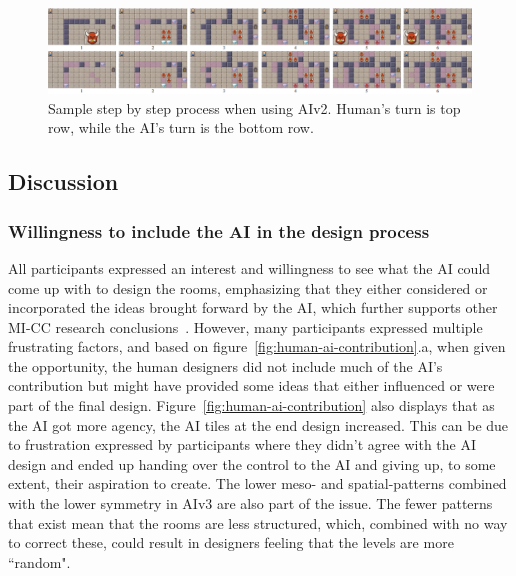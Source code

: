 


\begin{figure}[h!]
 \includegraphics[width=\textwidth]{images/rooms-designed-2.png}
 \caption{Sample step by step process when using AIv2. Human's turn is top row, while the AI's turn is the bottom row.}
 \label{fig:exampleDesignProcess}
\end{figure}

\subsection{Discussion}
\label{sec:discussion}


\subsubsection{Willingness to include the AI in the design process}

All participants expressed an interest and willingness to see what the AI could come up with to design the rooms, emphasizing that they either considered or incorporated the ideas brought forward by the AI, which further supports other MI-CC research conclusions~. However, many participants expressed multiple frustrating factors, and based on figure~\ref{fig:human-ai-contribution}.a, when given the opportunity, the human designers did not include much of the AI's contribution but might have provided some ideas that either influenced or were part of the final design. Figure~\ref{fig:human-ai-contribution} also displays that as the AI got more agency, the AI tiles at the end design increased. This can be due to frustration expressed by participants where they didn't agree with the AI design and ended up handing over the control to the AI and giving up, to some extent, their aspiration to create. The lower meso- and spatial-patterns combined with the lower symmetry in AIv3 are also part of the issue. The fewer patterns that exist mean that the rooms are less structured, which, combined with no way to correct these, could result in designers feeling that the levels are more ``random".


